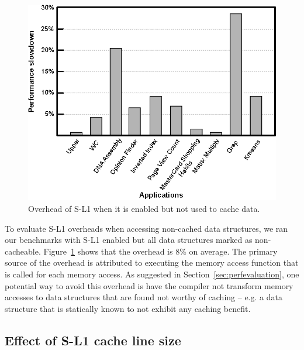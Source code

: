 \begin{figure}[t]
\center
\includegraphics[scale=0.82]{7cachingOverhead.eps}
\vspace{-0.0cm}
\caption{\footnotesize\textnormal{Overhead of S-L1 when it is enabled but not used to cache data.}}
\label{fig:sl1overhead}
\end{figure}



To evaluate S-L1 overheads when accessing non-cached data structures, we ran our benchmarks with S-L1 enabled but all
data structures marked as non-cacheable. Figure~\ref{fig:sl1overhead} shows that the overhead is 8\% on average.
The primary source of the overhead is attributed to executing the memory access function that is called for each memory access.
As suggested in Section~\ref{sec:perfevaluation}, one potential way to avoid this overhead is have the compiler not
transform memory accesses to data structures that are found not worthy of caching -- e.g. a data
structure that is statically known to not exhibit any caching benefit.



\subsection{Effect of S-L1 cache line size}
\label{sec:cachelineeffect}


